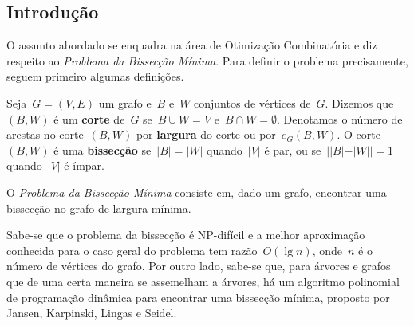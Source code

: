 \documentclass[a0,portrait]{a0poster}
\begin{document}
\begin{multicols}{3} %


\color{Navy} %


\color{Black} %
\section*{Introdução}
    O assunto abordado se
    enquadra na área de Otimização Combinatória e diz respeito ao 
    \emph{Problema da Bissecção Mínima}. Para definir o problema 
    precisamente, seguem primeiro algumas definições. 

    Seja~${G=(V,E)}$ um grafo e~$B$ e~$W$ conjuntos de vértices de~$G$.
    Dizemos que~$(B,W)$ é um \textbf{corte}
    de~$G$ se~${B \cup W = V}$ e~${B\cap W =\emptyset}$.
    Denotamos o número de arestas no corte~$(B,W)$ por \textbf{largura}
    do corte ou por~$e_G(B,W)$.
    O corte~$(B,W)$ é uma \textbf{bissecção} se~${|B| =|W|}$
    quando~$|V|$ é par, ou se~${||B|-|W|| =1}$ quando~$|V|$ é ímpar.

    O \emph{Problema da Bissecção Mínima} consiste em, dado um grafo, 
    encontrar uma bissecção no grafo de largura mínima.

    Sabe-se que o problema da bissecção é NP-difícil
    e a melhor aproximação conhecida para o caso geral do problema tem 
    razão~$O(\lg n)$, onde~$n$ é o número de vértices 
    do grafo. 
    Por outro lado, sabe-se que, para árvores e grafos que de uma 
    certa maneira se assemelham a árvores, há um algoritmo polinomial 
    de programação dinâmica para encontrar uma bissecção mínima, 
    proposto por Jansen, Karpinski, Lingas e Seidel. 


\end{multicols}
\end{document}
